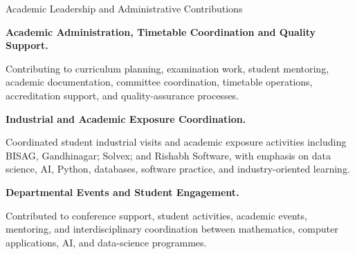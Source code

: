 \begin{rubric}{Academic Leadership and Administrative Contributions}

%
\textbf{Academic Administration, Timetable Coordination and Quality Support.}\par
Contributing to curriculum planning, examination work, student mentoring, academic documentation, committee coordination, timetable operations, accreditation support, and quality-assurance processes.

\entry*[2026]%
\textbf{Industrial and Academic Exposure Coordination.}\par
Coordinated student industrial visits and academic exposure activities including BISAG, Gandhinagar; Solvex; and Rishabh Software, with emphasis on data science, AI, Python, databases, software practice, and industry-oriented learning.

\entry*[2024 -- 2026]%
\textbf{Departmental Events and Student Engagement.}\par
Contributed to conference support, student activities, academic events, mentoring, and interdisciplinary coordination between mathematics, computer applications, AI, and data-science programmes.

\end{rubric}

